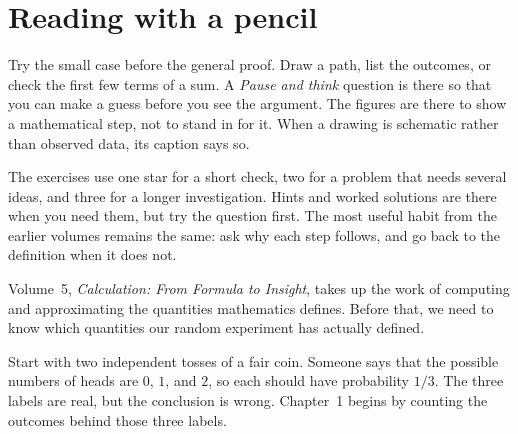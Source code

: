 \section*{Reading with a pencil}

Try the small case before the general proof. Draw a path, list the outcomes, or check the first few terms of a sum. A \emph{Pause and think} question is there so that you can make a guess before you see the argument. The figures are there to show a mathematical step, not to stand in for it. When a drawing is schematic rather than observed data, its caption says so.

The exercises use one star for a short check, two for a problem that needs several ideas, and three for a longer investigation. Hints and worked solutions are there when you need them, but try the question first. The most useful habit from the earlier volumes remains the same: ask why each step follows, and go back to the definition when it does not.

Volume~5, \emph{Calculation: From Formula to Insight}, takes up the work of computing and approximating the quantities mathematics defines. Before that, we need to know which quantities our random experiment has actually defined.

Start with two independent tosses of a fair coin. Someone says that the possible numbers of heads are $0$, $1$, and $2$, so each should have probability $1/3$. The three labels are real, but the conclusion is wrong. Chapter~1 begins by counting the outcomes behind those three labels.
